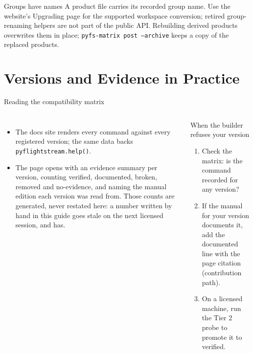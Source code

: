 \documentclass[aspectratio=169,10pt]{beamer}
\newcommand{\code}[1]{\texttt{\small #1}}
\begin{document}
\begin{frame}{Groups have names}
A product file carries its recorded group name. Use the website's Upgrading
page for the supported workspace conversion; retired group-renaming helpers
are not part of the public API. Rebuilding derived products overwrites them in place;
\code{pyfs-matrix post --archive} keeps a copy of the replaced products.
\end{frame}

\section{Versions and Evidence in Practice}

\begin{frame}{Reading the compatibility matrix}
  \begin{columns}[T]
    \begin{itemize}
      \item The docs site renders every command against every registered version; the same data backs \code{pyflightstream.help()}.
      \item The page opens with an evidence summary per version, counting {\color{statusblue}verified}, {\color{statusgreen}documented}, {\color{statusred}broken}, removed and no-evidence, and naming the manual edition each version was read from. Those counts are generated, never restated here: a number written by hand in this guide goes stale on the next licensed session, and has.
    \end{itemize}
    \begin{block}{When the builder refuses your version}
      \begin{enumerate}
        \item Check the matrix: is the command recorded for any version?
        \item If the manual for your version documents it, add the documented line with the page citation (contribution path).
        \item On a licensed machine, run the Tier 2 probe to promote it to verified.
      \end{enumerate}
    \end{block}
  \end{columns}
\end{frame}
\end{document}
